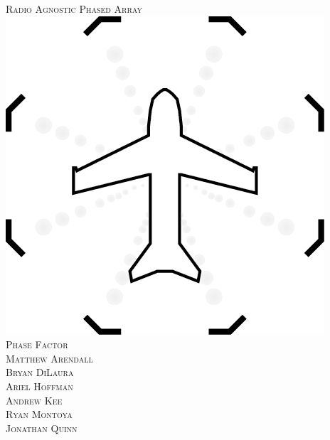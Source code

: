 \begin{titlepage}
\begin{center} 
\vspace*{2cm}
\textsc{\Huge Radio Agnostic Phased Array}\\[2cm]


\includegraphics[]{../Figures/PhaseFactorLogo.png}\\[.5cm]
\textsc{\LARGE Phase Factor}\\[3cm]

\textsc{\large Matthew Arendall}\\[0.2cm]
\textsc{\large Bryan DiLaura} \\[0.2cm]
\textsc{\large Ariel Hoffman} \\[0.2cm]
\textsc{\large Andrew Kee} \\[0.2cm]
\textsc{\large Ryan Montoya} \\[0.2cm]
\textsc{\large Jonathan Quinn} \\[0.2cm]

\end{center}
\end{titlepage}
